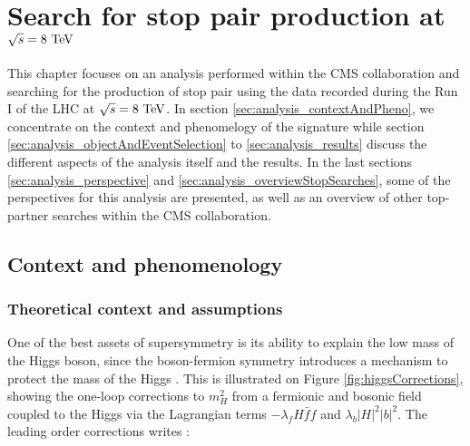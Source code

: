\setcounter{mtc}{4}
\chapter{Search for stop pair production at $\sqrt{s} = 8~\text{TeV}$}
\minitoc
\newpage

    This chapter focuses on an analysis performed within the CMS collaboration
    and searching for the production of stop pair using the data recorded during
    the Run I of the LHC at $\sqrt{s} = 8~\text{TeV}$. In section \ref{sec:analysis_contextAndPheno},
    we concentrate on the context and phenomelogy of the signature while section
    \ref{sec:analysis_objectAndEventSelection} to \ref{sec:analysis_results} discuss
    the different aspects of the analysis itself and the results. In the last sections
    \ref{sec:analysis_perspective} and \ref{sec:analysis_overviewStopSearches}, some
    of the perspectives for this analysis are presented, as well as an overview of
    other top-partner searches within the CMS collaboration.

    \section{Context and phenomenology \label{sec:analysis_contextAndPheno}}

        \subsection{Theoretical context and assumptions}


        One of the best assets of supersymmetry is its ability to explain the low mass
        of the Higgs boson, since the boson-fermion symmetry introduces a mechanism to
        protect the mass of the Higgs . This is illustrated on Figure
        \ref{fig:higgsCorrections}, showing the one-loop corrections to $m_H^2$
        from a fermionic and bosonic field coupled to the Higgs via the Lagrangian terms
        $- \lambda_f H \bar{f} f$ and $\lambda_b \left| H \right|^2 \left| b \right|^2$.
        The leading order corrections writes :


